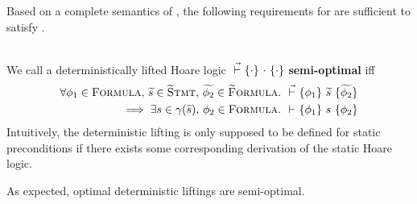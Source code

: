 Based on a complete semantics of \svl, the following requirements for \gvl are sufficient to satisfy .
\begin{definition}~\\
    \label{def:perf-stat}
    We call a deterministically lifted Hoare logic ${} \,\,\vec{\vdash}\,\, \{{\cdot}\} ~{\cdot}~ \{{\cdot}\}$ \textbf{semi-optimal} iff
    \begin{align*}
    \forall \phi_1 \in \textup{\textsc{Formula}},\, \widetilde{s} \in \textup{\textsc{\ensuremath{\widetilde{\text{S}}}tmt}},\, \widetilde{\phi_2} \in \textup{\textsc{\ensuremath{\widetilde{\text{F}}}ormula}}.&~ {} \,\,\vec{\vdash}\,\, \{{\phi_1}\} ~{\widetilde{s}}~ \{{\widetilde{\phi_2}}\}\\ \implies \exists s \in \gamma(\widetilde{s}),\, \phi_2 \in \textup{\textsc{Formula}}.&~ {} \,\,{\vdash}\,\, \{{\phi_1}\} ~{s}~ \{{\phi_2}\}
    \end{align*}
    Intuitively, the deterministic lifting is only supposed to be defined for static preconditions if there exists some corresponding derivation of the static Hoare logic.
    
    As expected, optimal deterministic liftings are semi-optimal.
\end{definition}

